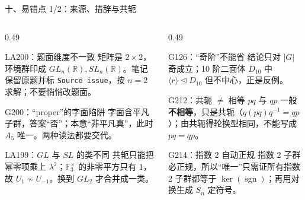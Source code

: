 \documentclass[aspectratio=169,10pt,fontset=none]{ctexbeamer}
\begin{document}
\begin{frame}[t]{十、易错点 1/2：来源、措辞与共轭}
  \label{sec:pitfalls}
  \begin{columns}[T,onlytextwidth]
    \begin{column}{0.49\textwidth}
      \begin{alertblock}{\footnotesize LA200：题面维度不一致}
        \scriptsize
        矩阵是 $2\times2$，环境群印成 $GL_n(\mathbb R),SL_n(\mathbb R)$。笔记保留原题并标 \texttt{Source issue}，按 $n=2$ 求解；不要悄悄改题面。
      \end{alertblock}
      \begin{alertblock}{\footnotesize G200：“proper”的字面陷阱}
        \scriptsize
        字面含平凡子群，答案“否”；本意“非平凡真”，此时 $A_5$ 唯一。两种读法都要交代。
      \end{alertblock}
      \begin{alertblock}{\footnotesize LA199：$GL$ 与 $SL$ 的类不同}
        \scriptsize
        共轭只能把幂零项乘上 $\lambda^2$；$\mathbb F_3^\times$ 的非零平方只有 $1$，故 $U_1\nsim U_{-1}$。换到 $GL_2$ 才合并成一类。
      \end{alertblock}
    \end{column}
    \begin{column}{0.49\textwidth}
      \begin{alertblock}{\footnotesize G126：“奇阶”不能省}
        \scriptsize
        结论只对 $|G|$ 奇成立；10 阶二面体 $D_{10}$ 中 $\langle r\rangle\trianglelefteq D_{10}$ 但不中心，正是反例。
      \end{alertblock}
      \begin{alertblock}{\footnotesize G212：共轭 $\ne$ 相等}
        \scriptsize
        $pq$ 与 $qp$ 一般\textbf{不相等}，只是共轭（$q(pq)q^{-1}=qp$）；由共轭得轮换型相同，不能写成 $pq=qp$。
      \end{alertblock}
      \begin{alertblock}{\footnotesize G214：指数 2 自动正规}
        \scriptsize
        指数 2 子群必正规，所以“唯一”只需证所有指数 2 子群都等于 $\ker(\operatorname{sgn})$；再用对换生成 $S_n$ 定符号。
      \end{alertblock}
    \end{column}
  \end{columns}
\end{frame}
\end{document}
